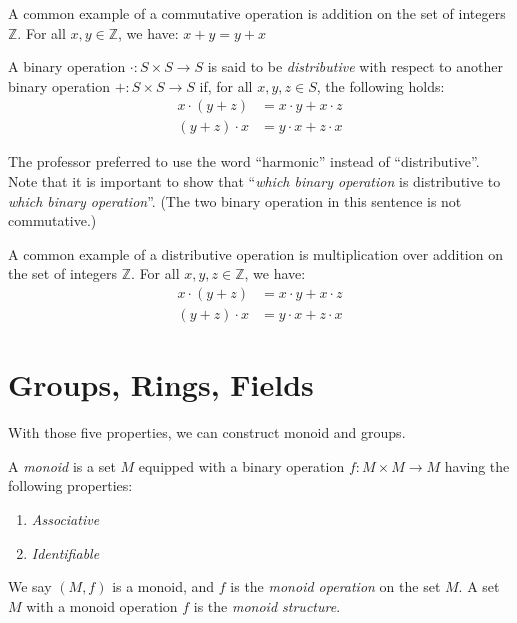 \documentclass[
	11pt, %
	fleqn, %
	a4paper, %
]{LegrandOrangeBook}
\newcommand{\Z}{\mathbb{Z}} %
\begin{document}
\begin{example}
    A common example of a commutative operation is addition on the set of integers $\Z$. For all $x,y \in \Z$, we have: $x + y = y + x$
\end{example}

\begin{definition}
    A binary operation $\cdot: S \times S \to S$ is said to be \emph{distributive} with respect to another binary operation $+: S \times S \to S$ if, for all $x,y,z \in S$, the following holds:
    \[ \begin{split}
        x \cdot (y + z) &= x \cdot y + x \cdot z \\
        (y + z) \cdot x &= y \cdot x + z \cdot x
    \end{split} \]
\end{definition}

The professor preferred to use the word ``harmonic'' instead of ``distributive''. Note that it is important to show that ``\emph{which binary operation} is distributive to \emph{which binary operation}''. (The two binary operation in this sentence is not commutative.)

\begin{example}
    A common example of a distributive operation is multiplication over addition on the set of integers $\Z$. For all $x,y,z \in \Z$, we have:
    \[ \begin{split}
        x \cdot (y + z) &= x \cdot y + x \cdot z \\
        (y + z) \cdot x &= y \cdot x + z \cdot x
    \end{split} \]
\end{example}

\newpage

\section{Groups, Rings, Fields}

With those five properties, we can construct monoid and groups.

\begin{definition}[Monoid]
    A \emph{monoid} is a set $M$ equipped with a binary operation $f: M \times M \to M$ having the following properties:
    \begin{enumerate}
        \item \emph{Associative}
        \item \emph{Identifiable}
    \end{enumerate}
    We say $(M, f)$ is a monoid, and $f$ is the \emph{monoid operation} on the set $M$. A set $M$ with a monoid operation $f$ is the \emph{monoid structure}.
\end{definition}
\end{document}
